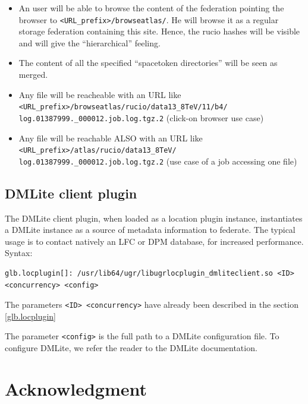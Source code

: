 \documentclass[12pt]{article} %
\begin{document}
\begin{itemize}
 \item An user will be able to browse the content of the federation pointing the browser to \lstinline{<URL_prefix>/browseatlas/}. He will browse it as a regular storage federation containing this site. Hence, the rucio hashes will be visible and will give the ``hierarchical'' feeling.
 \item The content of all the specified ``spacetoken directories'' will be seen as merged.
 \item Any file will be reacheable with an URL like \\
       \lstinline{<URL_prefix>/browseatlas/rucio/data13_8TeV/11/b4/}\\
       \lstinline{log.01387999._000012.job.log.tgz.2} (click-on browser use case)
 \item Any file will be reachable ALSO with an URL like \\
       \lstinline{<URL_prefix>/atlas/rucio/data13_8TeV/}\\
       \lstinline{log.01387999._000012.job.log.tgz.2} (use case of a job accessing one file)
\end{itemize}




\subsection{DMLite client plugin}

The DMLite client plugin, when loaded as a location plugin instance, instantiates a DMLite instance as a source of metadata information to federate. The typical usage is to contact natively an LFC or DPM database, for increased performance.\\

Syntax:\\
\begin{lstlisting}
glb.locplugin[]: /usr/lib64/ugr/libugrlocplugin_dmliteclient.so <ID> <concurrency> <config>
\end{lstlisting}

The parameters \lstinline"<ID> <concurrency>" have already been described in the section \ref{glb.locplugin}

The parameter \lstinline"<config>" is the full path to a DMLite configuration file. To configure DMLite, we refer the reader to the DMLite documentation.



\section*{Acknowledgment}
\end{document}
